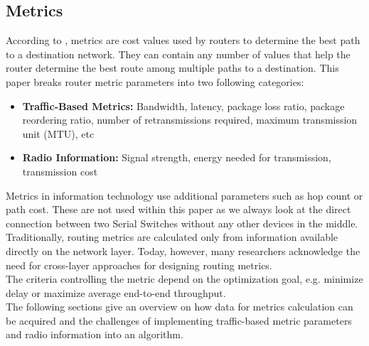 \subsection{Metrics}
According to \cite{RouterMetrics_Wiki}, metrics are cost values used by routers to determine the best path to a destination network. They can contain any number of values that help the router determine the best route among multiple paths to a destination. This paper breaks router metric parameters into two following categories:
\begin{itemize}
    \item \textbf{Traffic-Based Metrics:} Bandwidth, latency, package loss ratio, package reordering ratio, number of retransmissions required, maximum transmission unit (MTU), etc
    \item \textbf{Radio Information:} Signal strength, energy needed for transmission, transmission cost
\end{itemize}
Metrics in information technology use additional parameters such as hop count or path cost. These are not used within this paper as we always look at the direct connection between two Serial Switches without any other devices in the middle.\\
Traditionally, routing metrics are calculated only from information available directly on the network layer. Today, however, many researchers acknowledge the need for cross-layer approaches for designing routing metrics.\\
The criteria controlling the metric depend on the optimization goal, e.g. minimize delay or maximize average end-to-end throughput.\\
The following sections give an overview on how data for metrics calculation can be acquired and the challenges of implementing traffic-based metric parameters and radio information into an algorithm.
%

